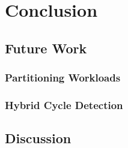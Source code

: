 \chapter{Conclusion}\label{chap:conclusion}
\section{Future Work}
\subsection{Partitioning Workloads}
\subsection{Hybrid Cycle Detection}
\section{Discussion}
